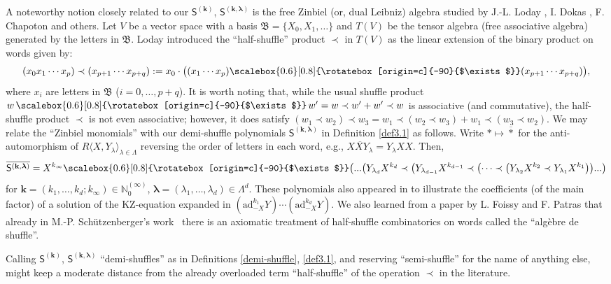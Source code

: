\documentclass[ALCO,Unicode,published]{cedram}
\def\bk{{\mathbf{k}}}
\def\SS{{\mathsf{S}}}
\def\blambda{{\boldsymbol \lambda}}
\def\N{{\mathbb N}}
\def\la{\langle}
\def\ra{\rangle}
\def\sha{\scalebox{0.6}[0.8]{\rotatebox[origin=c]{-90}{$\exists$}}}
\begin{document}
\begin{Note}
\label{zinbiel}
A noteworthy notion closely related to our $\SS^{(\bk)}$,
$\SS^{(\bk,\blambda)}$ is
the free Zinbiel (or, dual Leibniz) algebra 
studied by J.-L. Loday \cite{Lo95}, I. Dokas \cite{Do10}, F. Chapoton \cite{Ch21} and others.
Let $V$ be a vector space with a basis $\mathfrak{B}=\{X_0,X_1,\dots\}$ and 
$T(V)$ be the tensor algebra (free associative algebra) generated by the
letters in $\mathfrak{B}$.  Loday introduced the ``half-shuffle'' product $\prec$
in $T(V)$ as the linear extension of the binary product on words 
given by:
$$
(x_0x_1\cdots x_p)\prec (x_{p+1}\cdots x_{p+q})
:=
x_0\cdot \bigl( (x_1\cdots x_p)\sha (x_{p+1}\cdots x_{p+q})\bigr),
$$
where $x_i$ are letters in $\mathfrak{B}$ ($i=0,\dots, p+q$).
It is worth noting that, while the usual shuffle product $w\,\sha\, w'=w\prec w'+w'\prec w$ 
is associative (and commutative), the half-shuffle product 
$\prec$ is not even associative; however, it does satisfy
$(w_1\prec w_2)\prec w_3=w_1\prec (w_2\prec w_3)+w_1\prec (w_3\prec w_2)$.
We may relate the ``Zinbiel monomials'' 
with our demi-shuffle polynomials 
$\SS^{(\bk,\blambda)}$ in Definition \ref{def3.1} as follows.
Write $\ast\mapsto \overline{\ast}$ for the anti-automorphism of 
$R\la X,Y_\lambda\ra_{\lambda\in\Lambda}$
reversing the order of letters in each word, e.g., 
$\overline{XXY_\lambda}=Y_\lambda XX$.
Then,  
\begin{equation}
\label{semi-shuffle}
\overline{\SS^{(\bk,\blambda)}}=
X^{k_\infty}\sha \bigl(...
\bigl(Y_{\lambda_d}X^{k_d} \prec\bigl( Y_{\lambda_{d-1}}X^{k_{d-1}} \prec\bigl(
\cdots 
\prec \bigl( Y_{\lambda_2}X^{k_2} \prec Y_{\lambda_1}X^{k_1} \bigr)\bigr)...\bigr)
\end{equation}
for $\bk=(k_1,\dots,k_d; k_\infty)\in\N_0^{(\infty)}$,
$\blambda=(\lambda_1,\dots,\lambda_d)\in\Lambda^d$.
These polynomials also appeared in \cite[Proposition 5.10]{Minh2019} to 
illustrate the coefficients (of the main factor) of a solution of the 
KZ-equation expanded in 
$(\mathrm{ad}_{-X}^{k_1}Y)\cdots(\mathrm{ad}_{-X}^{k_d}Y)$.
We also learned from a paper by L. Foissy and F. Patras \cite{FP13} 
that already in M.-P. Sch\"utzenberger's work~\cite{Sch}
there is an axiomatic treatment of half-shuffle combinatorics 
on words called the ``alg\`ebre de shuffle''.


Calling  $\SS^{(\bk)}$, $\SS^{(\bk,\blambda)}$ 
``demi-shuffles'' as in Definitions \ref{demi-shuffle}, \ref{def3.1}, 
and reserving ``semi-shuffle'' for the
name of anything else,
might keep a moderate distance from the already overloaded term
``half-shuffle'' of the operation $\prec$ in the literature.
 \end{Note}
\end{document}
